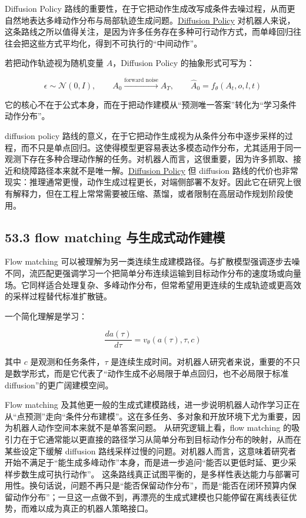 Diffusion Policy 路线的重要性，在于它把动作生成改写成条件去噪过程，从而更自然地表达多峰动作分布与局部轨迹生成问题。\href{https://arxiv.org/abs/2303.04137}{Diffusion Policy} 对机器人来说，这条路线之所以值得关注，是因为许多任务存在多种可行动作方式，而单峰回归往往会把这些方式平均化，得到不可执行的“中间动作”。

若把动作轨迹视为随机变量 \(A\)，Diffusion Policy 的抽象形式可写为：

\begingroup
\scriptsize
\begin{equation*}
\epsilon \sim \mathcal{N}(0, I), \qquad
A_0 \xrightarrow{\text{forward noise}} A_T, \qquad
\hat{A}_0 = f_\theta(A_t, o, l, t)
\end{equation*}
\endgroup

它的核心不在于公式本身，而在于把动作建模从“预测唯一答案”转化为“学习条件动作分布”。

diffusion policy 路线的意义，在于它把动作生成视为从条件分布中逐步采样的过程，而不只是单点回归。这使得模型更容易表达多模态动作分布，尤其适用于同一观测下存在多种合理动作解的任务。对机器人而言，这很重要，因为许多抓取、接近和绕障路径本来就不是唯一解。\href{https://arxiv.org/abs/2303.04137}{Diffusion Policy} 但 diffusion 路线的代价也非常现实：推理通常更慢，动作生成过程更长，对端侧部署不友好。因此它在研究上很有解释力，但在工程上常常需要被压缩、蒸馏，或者限制在高层动作规划阶段使用。

\subsection*{53.3 flow matching 与生成式动作建模}


Flow matching 可以被理解为另一类连续生成建模路径。与扩散模型强调逐步去噪不同，流匹配更强调学习一个把简单分布连续运输到目标动作分布的速度场或向量场。它同样适合处理复杂、多峰动作分布，但常希望用更连续的生成轨迹或更高效的采样过程替代标准扩散链。

一个简化理解是学习：

\begin{equation*}
\frac{d a(\tau)}{d\tau} = v_\theta(a(\tau), \tau, c)
\end{equation*}

其中 \(c\) 是观测和任务条件，\(\tau\) 是连续生成时间。对机器人研究者来说，重要的不只是数学形式，而是它代表了“动作生成不必局限于单点回归，也不必局限于标准 diffusion”的更广阔建模空间。

Flow matching 及其他更一般的生成式建模路线，进一步说明机器人动作学习正在从“点预测”走向“条件分布建模”。这在多任务、多对象和开放环境下尤为重要，因为机器人动作空间本来就不是单答案问题。 从研究逻辑上看，flow matching 的吸引力在于它通常能以更直接的路径学习从简单分布到目标动作分布的映射，从而在某些设定下缓解 diffusion 路线采样过慢的问题。对机器人而言，这意味着研究者开始不满足于“能生成多峰动作”本身，而是进一步追问“能否以更低时延、更少采样步数生成可执行动作”。 这条路线真正试图平衡的，是多样性表达能力与部署可用性。换句话说，问题不再只是“能否保留动作分布”，而是“能否在闭环预算内保留动作分布”；一旦这一点做不到，再漂亮的生成式建模也只能停留在离线表征优势，而难以成为真正的机器人策略接口。

